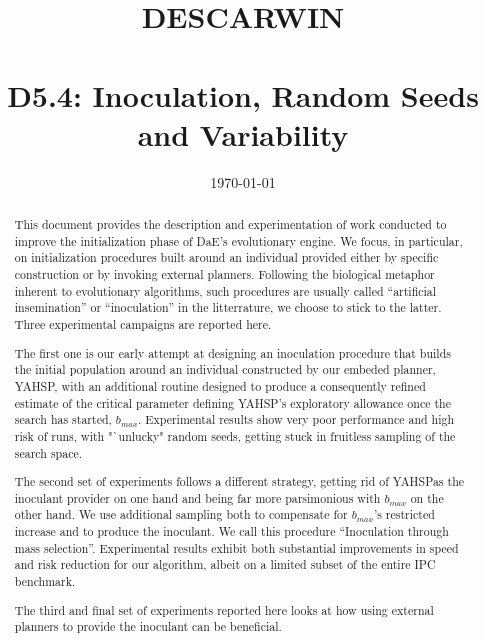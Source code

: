 \documentclass[english]{DESCARWINreport}
\title{DESCARWIN\\\bigskip {\em \LARGE The Marriage of Descartes and Darwin}\\\vspace{8cm} {\LARGE D5.4: Inoculation, Random Seeds and Variability}}
\date{\today}
\newcommand{\YAHSP}{{\sc YAHSP}}
\begin{document}
\maketitle


\begin{revisions}
\begin{revtable}
\end{revtable}
\begin{revisionlabels}
\revlabel{}
\end{revisionlabels}
\end{revisions}

\begin{abstract}
This document provides the description and experimentation of work conducted to improve the initialization phase of DaE's evolutionary engine. We focus, in particular, on initialization procedures built around an individual provided either by specific construction or by invoking external planners. Following the biological metaphor inherent to evolutionary algorithms, such procedures are usually called "`artificial insemination"' or "`inoculation"' in the litterrature, we choose to stick to the latter. Three experimental campaigns are reported here. 

The first one is our early attempt at designing an inoculation procedure that builds the initial population around an individual constructed by our embeded planner, \YAHSP, with an additional routine designed to produce a consequently refined estimate of the critical parameter defining \YAHSP's exploratory allowance once the search has started, {$b_{max}$}. Experimental results show very poor performance and high risk of runs, with "`unlucky" random seeds, getting stuck in fruitless sampling of the search space. 

The second set of experiments follows a different strategy, getting rid of \YAHSP as the inoculant provider on one hand and being far more parsimonious with {$b_{max}$} on the other hand. We use additional sampling both to compensate for {$b_{max}$}'s restricted increase and to produce the inoculant. We call this procedure "`Inoculation through mass selection"'. Experimental results exhibit both substantial improvements in speed and risk reduction for our algorithm, albeit on a limited subset of the entire IPC benchmark. 

The third and final set of experiments reported here looks at how using external planners to provide the inoculant can be beneficial.
\end{abstract}
\end{document}
